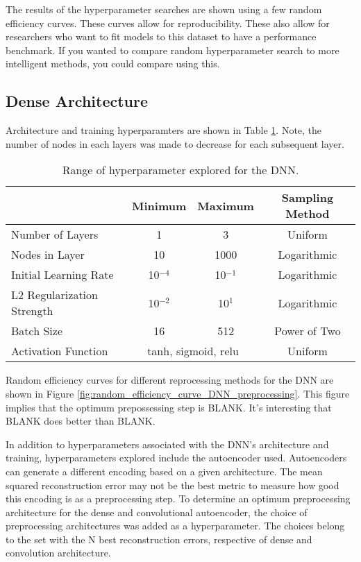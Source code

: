 The results of the hyperparameter searches are shown using a few random efficiency curves. These curves allow for reproducibility. These also allow for researchers who want to fit models to this dataset to have a performance benchmark. If you wanted to compare random hyperparameter search to more intelligent methods, you could compare using this.

\subsection{Dense Architecture}

Architecture and training hyperparamters are shown in Table \ref{table:hyperparameter_dataset_parameters}. Note, the number of nodes in each layers was made to decrease for each subsequent layer.

\begin{table}[H]
\centering
\caption{Range of hyperparameter explored for the DNN.}
\label{table:hyperparameter_dataset_parameters}
\begin{tabular}{l|c|c|c|}
\cline{2-4}
 & \multicolumn{1}{r|}{Minimum} & \multicolumn{1}{l|}{Maximum} & Sampling Method \\ \hline
\multicolumn{1}{|l|}{Number of Layers} & 1 & 3 & Uniform \\ \hline
\multicolumn{1}{|l|}{Nodes in Layer} & 10 & 1000 & Logarithmic \\ \hline
\multicolumn{1}{|l|}{Initial Learning Rate} & 10$^{-4}$ & 10$^{-1}$ & Logarithmic \\ \hline
\multicolumn{1}{|l|}{L2 Regularization Strength} & 10$^{-2}$ & 10$^{1}$ & Logarithmic \\ \hline
\multicolumn{1}{|l|}{Batch Size} & 16 & 512 & Power of Two \\ \hline
\multicolumn{1}{|l|}{Activation Function} & \multicolumn{2}{c|}{tanh, sigmoid, relu} & Uniform \\ \hline
\end{tabular}
\end{table}



Random efficiency curves for different reprocessing methods for the DNN are shown in Figure \ref{fig:random_efficiency_curve_DNN_preprocessing}. This figure implies that the optimum prepossessing step is BLANK. It's interesting that BLANK does better than BLANK. 

In addition to hyperparameters associated with the DNN's architecture and training, hyperparameters explored include the autoencoder used. Autoencoders can generate a different encoding based on a given architecture. The mean squared reconstruction error may not be the best metric to measure how good this encoding is as a preprocessing step. To determine an optimum preprocessing architecture for the dense and convolutional autoencoder, the choice of preprocessing architectures was added as a hyperparameter. The choices belong to the set with the N best reconstruction errors, respective of dense and convolution architecture.

